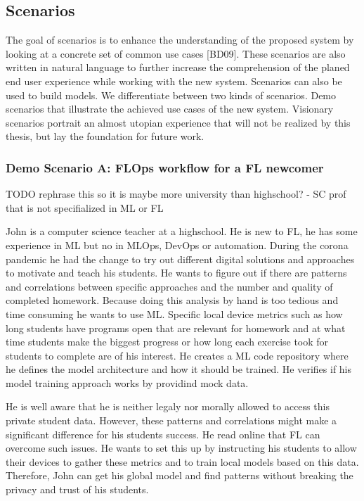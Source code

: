 
\subsection{Scenarios}

The goal of scenarios is to enhance the understanding of the proposed system by looking at a concrete set of common use cases [BD09].
These scenarios are also written in natural language to further increase the comprehension of the planed end user experience while working with the new system.
Scenarios can also be used to build models. We differentiate between two kinds of scenarios.
Demo scenarios that illustrate the achieved use cases of the new system.
Visionary scenarios portrait an almost utopian experience that will not be realized by this thesis, but lay the foundation for future work.



\subsubsection{Demo Scenario A: FLOps workflow for a FL newcomer}

TODO rephrase this so it is maybe more university than highschool? - SC prof that is not specifialized in ML or FL

John is a computer science teacher at a highschool.
He is new to FL, he has some experience in ML but no in MLOps, DevOps or automation.
During the corona pandemic he had the change to try out different digital solutions and approaches to motivate and teach his students.
He wants to figure out if there are patterns and correlations between specific approaches and the number and quality of completed homework.
Because doing this analysis by hand is too tedious and time consuming he wants to use ML.
Specific local device metrics such as how long students have programs open that are relevant for homework and at what time students make the biggest progress
or how long each exercise took for students to complete are of his interest.
He creates a ML code repository where he defines the model architecture and how it should be trained.
He verifies if his model training approach works by providind mock data.

He is well aware that he is neither legaly nor morally allowed to access this private student data.
However, these patterns and correlations might make a significant difference for his students success.
He read online that FL can overcome such issues.
He wants to set this up by instructing his students to allow their devices to gather these metrics and to train local models based on this data.
Therefore, John can get his global model and find patterns without breaking the privacy and trust of his students.

